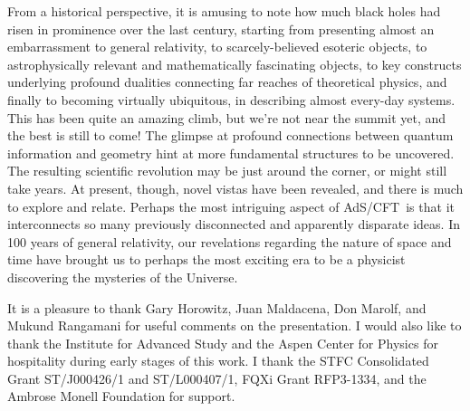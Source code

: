 \documentclass[12pt]{article}
\def\AC{AdS/CFT}
\def\GR{general relativity}
\begin{document}
From a historical perspective, it is amusing to note how much black holes had risen in prominence over the last century,
starting from presenting almost an embarrassment to general relativity, to scarcely-believed esoteric objects, to astrophysically relevant and mathematically fascinating objects, to key constructs underlying profound dualities connecting far reaches of theoretical physics, and finally to becoming virtually ubiquitous, in describing almost every-day systems.  This has been quite an amazing climb, but we're not near the summit yet, and the best is still to come!  The glimpse at profound connections between quantum information and geometry hint at more fundamental structures to be uncovered.  The resulting scientific revolution may be just around the corner, or might still take years.  At present, though, novel vistas have been revealed, and there is much to explore and relate.
Perhaps the most intriguing aspect of  \AC\ is that it interconnects so many previously disconnected and apparently disparate ideas.
In 100 years of \GR, our revelations regarding the nature of space and time  have brought us to perhaps the most exciting era to be a physicist discovering the mysteries of the Universe.


\acknowledgments 

It is a pleasure to thank Gary Horowitz, Juan Maldacena, Don Marolf, and Mukund Rangamani for useful comments on the presentation.
I would also like to thank the  Institute for Advanced Study and the Aspen Center for Physics for hospitality during early stages of this work.
I thank the STFC Consolidated Grant ST/J000426/1 and  ST/L000407/1, FQXi Grant RFP3-1334, and the Ambrose Monell Foundation for support.


%
%
\end{document}
